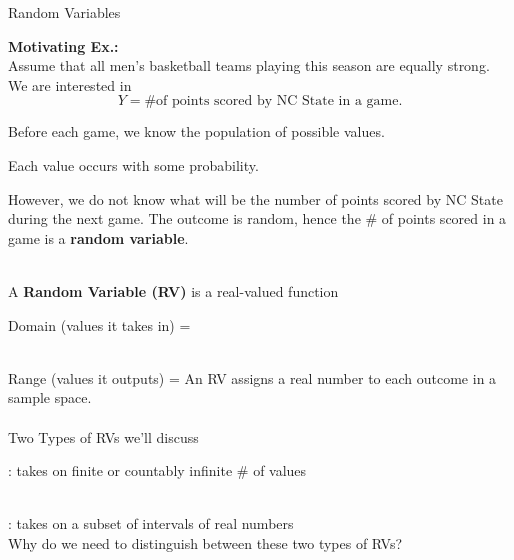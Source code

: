 \huge Random Variables\\\normalsize

\textbf{Motivating Ex.:}\\
Assume that all men’s basketball teams playing this season are equally strong. We are interested in 
$$Y = \mbox{\# of points scored by NC State in a game.}$$
\bi
\item Before each game, we know the population of possible values.
\item Each value occurs with some probability.  
\item However, we do not know what will be the number of points scored by NC State during the next game. 
\ei
The outcome is random, hence the \# of points scored in a game is a \textbf{random variable}.\\~\\

\bi
\item A \textbf{Random Variable (RV)} is a real-valued function\\
\bi
\item Domain (values it takes in) = \underbar{~~~~~~~~~~~~~~~~~~~~~~~~~~~~~~~~~~~~~~~~~~~~~~~}\\~\\
\item Range (values it outputs) = \underbar{~~~~~~~~~~~~~~~~~~~~~~~~~~~~~~~~~~~~~~~~~~~~~~~~}
\ei
An RV assigns a real number to each outcome in a sample space.\\~\\
\ei
Two Types of RVs we'll discuss\\
\bi
\item \underbar{~~~~~~~~~~~~~~~~~~~~~~~~~~~~~~~~~~~~~~~~~~~~~~~~~}: takes on finite or countably infinite \# of values\\~\\
\item \underbar{~~~~~~~~~~~~~~~~~~~~~~~~~~~~~~~~~~~~~~~~~~~~~~~~~}: takes on a subset of intervals of real numbers
\ei
~\\
Why do we need to distinguish between these two types of RVs?

\pagebreak

